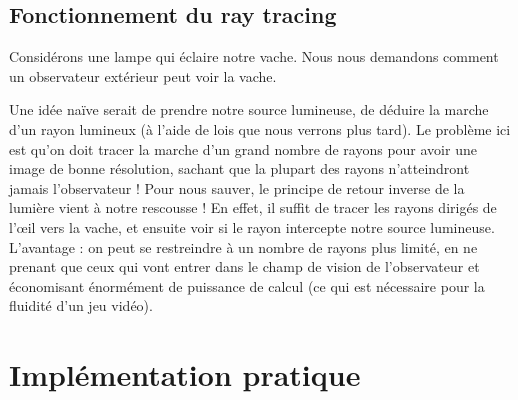 \documentclass{classe}
\begin{document}
\subsection{Fonctionnement du ray tracing}
Considérons une lampe qui éclaire notre vache. Nous nous demandons comment un observateur extérieur peut voir la vache.


Une idée naïve serait de prendre notre source lumineuse, de déduire la marche d'un rayon lumineux (à l'aide de lois que nous verrons plus tard).
Le problème ici est qu'on doit tracer la marche d'un grand nombre de rayons pour avoir une image de bonne résolution, sachant que la plupart des rayons n'atteindront jamais l'observateur !
Pour nous sauver, le principe de retour inverse de la lumière vient à notre rescousse ! En effet, il suffit de tracer les rayons dirigés de l'\oe il vers la vache, et ensuite voir si le rayon intercepte notre source lumineuse.
L'avantage : on peut se restreindre à un nombre de rayons plus limité, en ne prenant que ceux qui vont entrer dans le champ de vision de l'observateur et économisant énormément de puissance de calcul (ce qui est nécessaire pour la fluidité d'un jeu vidéo).

\section{Implémentation pratique}
\end{document}
